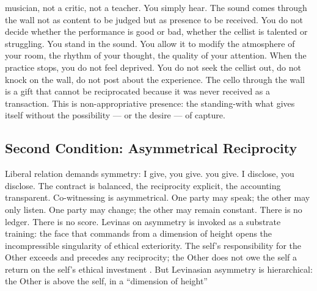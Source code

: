 musician, not a critic, not a teacher. You simply hear. The sound comes through the wall not as content to be judged but as presence to be received. You do not decide whether the performance is good or bad, whether the cellist is talented or struggling. You stand in the sound. You allow it to modify the atmosphere of your room, the rhythm of your thought, the quality of your attention. When the practice stops, you do not feel deprived. You do not seek the cellist out, do not knock on the wall, do not post about the experience. The cello through the wall is a gift that cannot be reciprocated because it was never received as a transaction. This is non-appropriative presence: the standing-with what gives itself without the possibility — or the desire — of capture.

\subsection{Second Condition: Asymmetrical Reciprocity}

Liberal relation demands symmetry: I give, you give. you give. I disclose, you disclose. The contract is balanced, the reciprocity explicit, the accounting transparent. Co-witnessing is asymmetrical. One party may speak; the other may only listen. One party may change; the other may remain constant. There is no ledger. There is no score. Levinas on asymmetry is invoked as a substrate training: the face that commands from a dimension of height opens the incompressible singularity of ethical exteriority. The self’s responsibility for the Other exceeds and precedes any reciprocity; the Other does not owe the self a return on the self’s ethical investment \cite[pp.~111--134]{levinas_1974}. But Levinasian asymmetry is hierarchical: the Other is above the self, in a “dimension of height”

